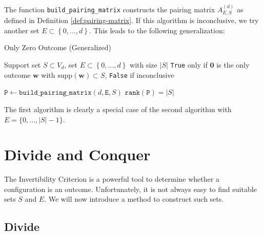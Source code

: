 The function \texttt{build\_pairing\_matrix} constructs the pairing matrix \( A^{(d)}_{E,S} \) as defined in Definition \ref{def:pairing-matrix}. If this algorithm is inconclusive, we try another set \( E \subset \left\{ 0, \dots, d \right\} \). This leads to the following generalization:

\begin{algorithm}[H]
\caption{Only Zero Outcome (Generalized)}\label{alg:hyperfield_criterion:is_zero_general}
    \begin{algorithmic}[1]
    \Require Support set $S \subset {V_d}$, set \( E \subset \left\{ 0, \dots, d \right\} \) with size \( \lvert S \vert \)
    \Ensure \texttt{True} only if \( \mathbf{0} \) is the only outcome \( \mathbf{w} \) with \( \mathrm{supp}(\mathbf{w}) \subset S \), \texttt{False} if inconclusive

    \State $\texttt{P} \gets \texttt{build\_pairing\_matrix}(d, \texttt{E}, S)$    
    \State \Return $\texttt{rank}(\texttt{P}) = |S|$
    \end{algorithmic}  
\end{algorithm}
The first algorithm is clearly a special case of the second algorithm with \( E =  \{0, \dots, |{S}| - 1\}\).

\section{Divide and Conquer}\label{sec:divide-and-conquer}

The Invertibility Criterion is a powerful tool to determine whether a configuration is an outcome. Unfortunately, it is not always easy to find suitable sets \( S \) and \( E \). We will now introduce a method to construct such sets.

\subsection*{Divide}\label{subsec:divide}

